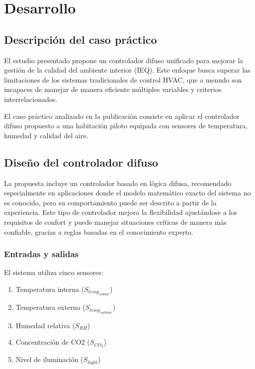 \section{Desarrollo}

\parencite{molina2013unifying}

\subsection{Descripción del caso práctico}

El estudio presentado propone un controlador difuso unificado para mejorar la gestión de la calidad del ambiente interior (IEQ). Este enfoque busca superar las limitaciones de los sistemas tradicionales de control HVAC, que a menudo son incapaces de manejar de manera eficiente múltiples variables y criterios interrelacionados. 

El caso práctico analizado en la publicación consiste en aplicar el controlador difuso propuesto a una habitación piloto equipada con sensores de temperatura, humedad y calidad del aire. 

\subsection{Diseño del controlador difuso}

La propuesta incluye un controlador basado en lógica difusa, recomendado especialmente en aplicaciones donde el modelo matemático exacto del sistema no es conocido, pero su comportamiento puede ser descrito a partir de la experiencia. Este tipo de controlador mejora la flexibilidad ajustándose a los requisitos de confort y puede manejar situaciones críticas de manera más confiable, gracias a reglas basadas en el conocimiento experto.

\subsubsection{Entradas y salidas}

El sistema utiliza cinco sensores:

\begin{enumerate}
	\item Temperatura interna ($S_{temp_{indoor}}$)
	\item Temperatura externa ($S_{temp_{outdoor}}$)
	\item Humedad relativa ($S_{RH}$)
	\item Concentración de CO2 ($S_{CO_2}$)
	\item Nivel de iluminación ($S_{light}$)
\end{enumerate}

